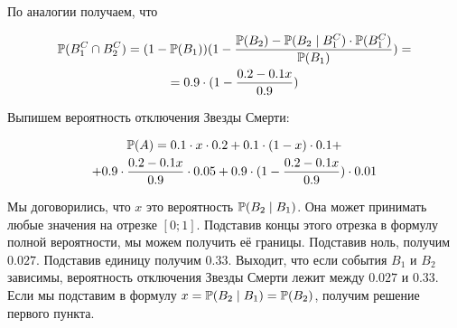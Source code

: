 \begin{sol}
По аналогии получаем, что 

\begin{multline*}
\mathbb{P}(B_1^C \cap B_2^C) = (1 - \mathbb{P}(B_1))(1 - \frac{\mathbb{P}(B_2) - \mathbb{P}(B_2 \mid B_1^C) \cdot \mathbb{P}(B_1^C)}{\mathbb{P}(B_1)} ) = \\ =  0.9 \cdot (1 - \frac{0.2 - 0.1 x}{0.9})
\end{multline*}

Выпишем вероятность отключения Звезды Смерти: 
		
\begin{multline*}
\mathbb{P}(A) = 0.1 \cdot x \cdot 0.2 + 0.1 \cdot (1-x) \cdot 0.1 + \\ + 0.9 \cdot \frac{0.2 - 0.1x}{0.9} \cdot 0.05 + 0.9 \cdot (1 - \frac{0.2 - 0.1x}{0.9}) \cdot 0.01
\end{multline*}
		
Мы договорились, что  $x$ это вероятность $\mathbb{P}(B_2 \mid B_1)$. Она может принимать любые значения на отрезке $[0;1]$. Подставив концы этого отрезка в формулу полной вероятности, мы можем получить её границы. Подставив ноль, получим $0.027$. Подставив единицу получим $0.33$. Выходит, что если события $B_1$ и $B_2$ зависимы, вероятность отключения Звезды Смерти лежит между $0.027$ и $0.33$. Если мы подставим в формулу $ x = \mathbb{P}(B_2 \mid B_1) = \mathbb{P}(B_2)$, получим решение первого пункта.
\end{sol}


%	


